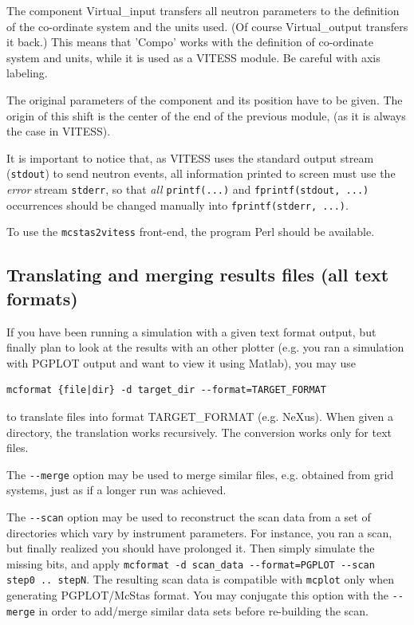 The component Virtual\_input transfers all neutron parameters to the \MCS
definition of the co-ordinate system and the units used. (Of course
Virtual\_output transfers it back.) This means that 'Compo' works with the
\MCS definition of co-ordinate system and units, while it is used as a VITESS
module. Be careful with axis labeling.

The original parameters of the component and its position have to be given. The
origin of this shift is the center of the end of the previous module, (as it is
always the case in VITESS).

It is important to notice that, as VITESS uses the standard output stream
(\verb+stdout+) to send neutron events, all information printed to screen must
use the \emph{error} stream \verb+stderr+, so that \emph{all} \verb+printf(...)+
and \verb+fprintf(stdout, ...)+ occurrences should be changed manually into
\verb+fprintf(stderr, ...)+.

To use the \verb+mcstas2vitess+ front-end, the program Perl should be available.

\subsection{Translating and merging \MCS results files (all text formats)}
\label{s:mcformat}

If you have been running a \MCS simulation with a given text format output, but
finally plan to look at the results with an other plotter (e.g. you ran a
simulation with PGPLOT output and want to view it using Matlab), you may use
\begin{lstlisting}
mcformat {file|dir} -d target_dir --format=TARGET_FORMAT
\end{lstlisting}
to translate files into format TARGET\_FORMAT (e.g. NeXus). When given a directory, the
translation works recursively. The conversion works only for text files.

The \verb+--merge+ option may be used to merge similar files, e.g. obtained from
grid systems, just as if a longer run was achieved.

The \verb+--scan+ option may be used to reconstruct the scan data from a set of
directories which vary by instrument parameters. For instance, you ran a scan,
but finally realized you should have prolonged it. Then simply simulate the
missing bits, and apply
\verb+mcformat -d scan_data --format=PGPLOT --scan step0 .. stepN+. The
resulting scan data is compatible with \verb+mcplot+ only when generating
PGPLOT/McStas format.
You may conjugate this option with the
\verb+--merge+ in order to add/merge similar data sets before re-building the
scan.

